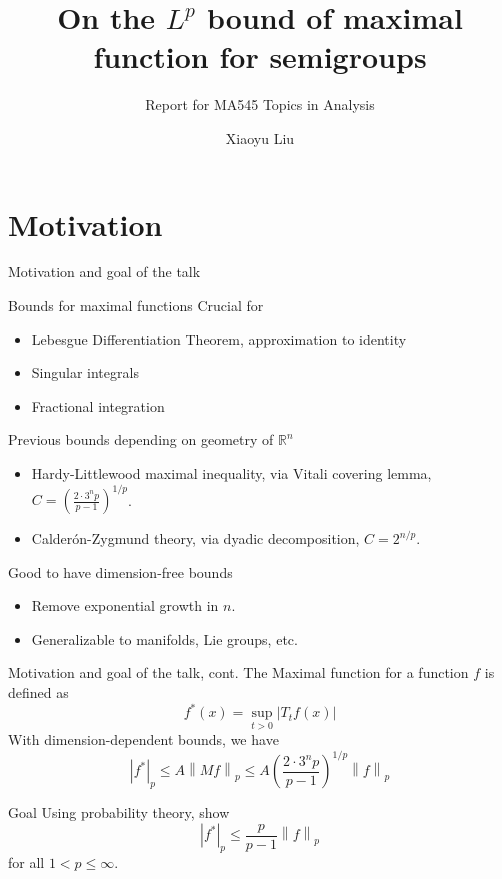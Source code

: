 \documentclass{if-beamer}
\title[Maximal Function for Semigroup]{On the $L^p$ bound of maximal function for semigroups}
\subtitle{Report for MA545 Topics in Analysis}
\author[Liu]{Xiaoyu Liu} %
\institute[Purdue]{Purdue University \and \textbf{Instructed by Prof. Rodrigos Ba\~nuelos}}
\begin{document}
\begin{frame}
  \titlepage
\end{frame}

\section{Motivation}

\begin{frame}{Motivation and goal of the talk}

\begin{block}{Bounds for maximal functions}
    Crucial for
    \begin{itemize}
    \item Lebesgue Differentiation Theorem, approximation to identity
    \item Singular integrals
    \item Fractional integration
    \end{itemize}
    Previous bounds depending on geometry of $\mathbb{R}^n$
    \begin{itemize}
    \item Hardy-Littlewood maximal inequality, via Vitali covering lemma, $C = \left(\frac{2 \cdot 3^n p}{p- 1}\right)^{1/p}$.
    \item Calder\'on-Zygmund theory, via dyadic decomposition, $C = 2^{n/p}$.
    \end{itemize}
\end{block}

\begin{block}{Good to have dimension-free bounds}
    \begin{itemize}
        \item Remove exponential growth in $n$.
        \item Generalizable to manifolds, Lie groups, etc.
    \end{itemize}
\end{block}

\end{frame}

\begin{frame}{Motivation and goal of the talk, cont.}
    The Maximal function for a function $f$ is defined as
    \begin{equation*}
        f^*(x) = \sup_{t > 0} |T_t f(x)|
    \end{equation*}
    With dimension-dependent bounds, we have
    \begin{equation*}
        \left|f^*\right|_p \leq A \left\|Mf\right\|_p \leq A\left(\frac{2 \cdot 3^n p}{p- 1}\right)^{1/p} \left\|f\right\|_p
    \end{equation*}
    \begin{block}{Goal}
        Using probability theory, show
        \begin{equation*}
            \left|f^*\right|_p \leq \frac{p}{p-1} \left\|f\right\|_p
        \end{equation*}
        for all $1<p\leq \infty$.
    \end{block}
\end{frame}
\end{document}
